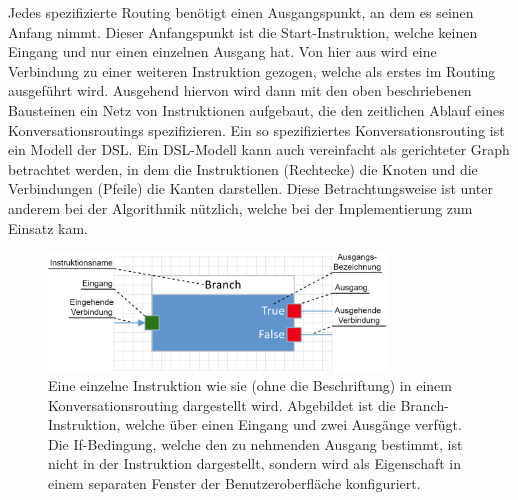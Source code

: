 \newline
Jedes spezifizierte Routing benötigt einen Ausgangspunkt, an dem es seinen Anfang nimmt. Dieser Anfangspunkt ist die Start-Instruktion, welche keinen Eingang und nur einen einzelnen Ausgang hat. Von hier aus wird eine Verbindung zu einer weiteren Instruktion gezogen, welche als erstes im Routing ausgeführt wird. Ausgehend hiervon wird dann mit den oben beschriebenen Bausteinen ein Netz von Instruktionen aufgebaut, die den zeitlichen Ablauf eines Konversationsroutings spezifizieren. Ein so spezifiziertes Konversationsrouting ist ein Modell der DSL.
\newline
Ein DSL-Modell kann auch vereinfacht als gerichteter Graph betrachtet werden, in dem die Instruktionen (Rechtecke) die Knoten und die Verbindungen (Pfeile) die Kanten darstellen. Diese Betrachtungsweise ist unter anderem bei der Algorithmik nützlich, welche bei der Implementierung zum Einsatz kam.

\begin{figure} %
	\centering
		\includegraphics[width=0.8\textwidth]{img/SingleNodeWithAnnotations.png}
	\caption[Beschriftung einer DSL-Instruktion]{Eine einzelne Instruktion wie sie (ohne die Beschriftung) in einem Konversationsrouting dargestellt wird. Abgebildet ist die Branch-Instruktion, welche über einen Eingang und zwei Ausgänge verfügt. Die If-Bedingung, welche den zu nehmenden Ausgang bestimmt, ist nicht in der Instruktion dargestellt, sondern wird als Eigenschaft in einem separaten Fenster der Benutzeroberfläche konfiguriert.}
	\label{fig:SingleNode}
\end{figure}

